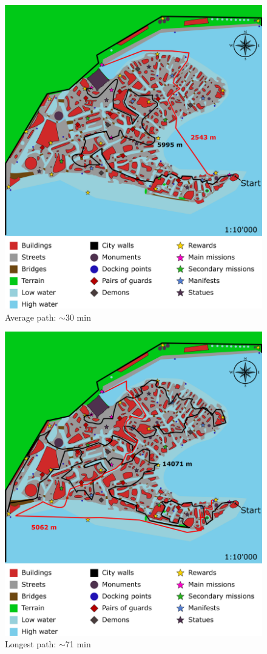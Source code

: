 \begin{figure}[H]
    \centering
	\includegraphics[width=\textwidth]{Images/Diagrams/dynamiapath2.png}
	\caption{Average path: $\sim$30 min}
\end{figure}

\begin{figure}[H]
    \centering
	\includegraphics[width=\textwidth]{Images/Diagrams/dynamiapath3.png}
	\caption{Longest path: $\sim$71 min}
\end{figure}

